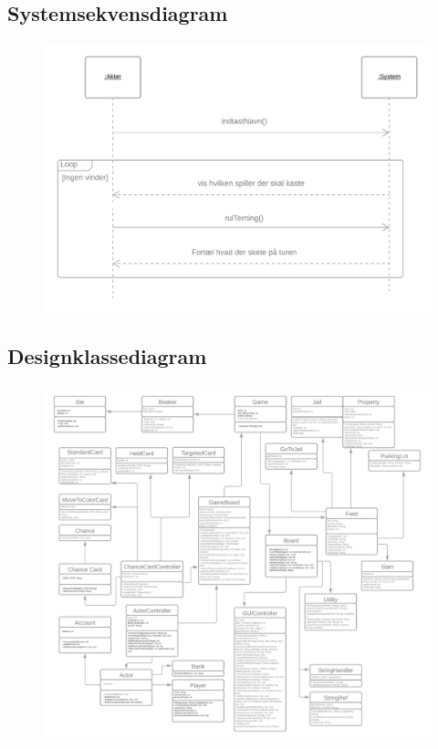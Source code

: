 \subsection{Systemsekvensdiagram}
\begin{figure}
\includegraphics[scale=0.2]{artifacts/SSD.png}
\end{figure}
\newpage
\subsection{Designklassediagram}
\begin{figure}[h!]
\includegraphics[scale=0.16]{artifacts/DCD.png}
\end{figure}